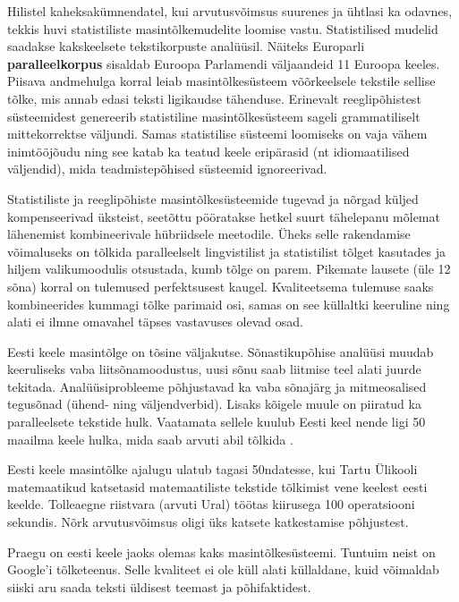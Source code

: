 \documentclass[]{../metanetpaper}
\begin{document}
\begin{multicols}{2}
Hilistel kaheksakümnendatel, kui arvutusvõimsus suurenes ja ühtlasi ka odavnes, tekkis huvi statistiliste masintõlkemudelite loomise vastu. 
Statistilised mudelid saadakse kakskeelsete tekstikorpuste analüüsil. 
Näiteks Europarli \textbf{paralleelkorpus} sisaldab Euroopa Parlamendi väljaandeid 11 Euroopa keeles. 
Piisava andmehulga korral leiab masintõlkesüsteem võõrkeelsele tekstile sellise tõlke, mis annab edasi teksti ligikaudse tähenduse. 
Erinevalt reeglipõhistest süsteemidest genereerib statistiline masintõlkesüsteem sageli grammatiliselt mittekorrektse väljundi. 
Samas statistilise süsteemi loomiseks on vaja vähem inimtööjõudu ning see katab ka teatud keele eripärasid (nt idiomaatilised väljendid), mida teadmistepõhised süsteemid ignoreerivad. 


Statistiliste ja reeglipõhiste masintõlkesüsteemide tugevad ja nõrgad küljed kompenseerivad üksteist, seetõttu pööratakse hetkel suurt tähelepanu mõlemat lähenemist kombineerivale hübriidsele meetodile. 
Üheks selle rakendamise võimaluseks on tõlkida paralleelselt lingvistilist ja statistilist tõlget kasutades ja hiljem valikumoodulis otsustada, kumb tõlge on parem. 
Pikemate lausete (üle 12 sõna) korral on tulemused perfektsusest kaugel. 
Kvaliteetsema tulemuse saaks kombineerides kummagi tõlke parimaid osi, samas on see küllaltki keeruline ning alati ei ilmne omavahel täpses vastavuses olevad osad. 



Eesti keele masintõlge on tõsine väljakutse. 
Sõnastikupõhise analüüsi muudab keeruliseks vaba liitsõnamoodustus, uusi sõnu saab liitmise teel alati juurde tekitada. 
Analüüsiprobleeme põhjustavad ka vaba sõnajärg ja mitmeosalised tegusõnad (ühend- ning väljendverbid). 
Lisaks kõigele muule on piiratud ka paralleelsete tekstide hulk. 
Vaatamata sellele kuulub Eesti keel nende ligi 50 maailma keele hulka, mida saab arvuti abil tõlkida \cite{Koit}.

Eesti keele masintõlke ajalugu ulatub tagasi 50ndatesse, kui Tartu Ülikooli matemaatikud katsetasid matemaatiliste tekstide tõlkimist vene keelest eesti keelde. 
Tolleaegne riistvara (arvuti Ural) töötas kiirusega 100 operatsiooni sekundis. Nõrk arvutusvõimsus oligi üks katsete katkestamise põhjustest. 

Praegu on eesti keele jaoks olemas kaks masintõlkesüsteemi. 
Tuntuim neist on Google’i tõlketeenus. 
Selle kvaliteet ei ole küll alati küllaldane, kuid võimaldab \mbox{siiski} aru saada teksti üldisest teemast ja põhifaktidest.


\end{multicols}
\end{document}
